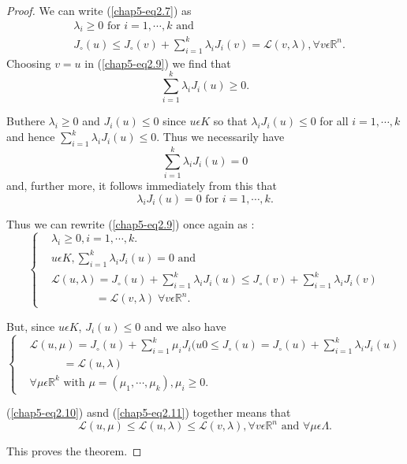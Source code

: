 \begin{proof}
We can write (\ref{chap5-eq2.7}) as
\begin{align*}
& \lambda_{i} \geq 0 \text{ for } i = 1, \cdots, k \text{ and }\\
& J_{\circ}(u) \leq J_{\circ}(v) + \sum_{i=1}^{k} \lambda_{i} J_{i} (v) = \mathscr{L}(v, \lambda), \forall v \epsilon \mathbb{R}^{n}.\tag{2.9}\label{chap5-eq2.9}
\end{align*}
Choosing $v = u$ in (\ref{chap5-eq2.9}) we find that
$$
\sum_{i=1}^{k} \lambda_{i} J_{i}(u) \geq 0.
$$

But\pageoriginale here $\lambda_{i} \geq 0$ and $J_{i} (u) \leq 0$ since $u \epsilon K$ so that $\lambda_{i} J_{i}(u) \leq 0$ for all $i = 1, \cdots, k$ and hence $\sum_{i=1}^{k} \lambda_{i} J_{i} (u) \leq 0$. Thus we necessarily have
$$
\sum_{i=1}^{k} \lambda_{i} J_{i}(u) = 0
$$
and, further more, it follows immediately from this that
$$
\lambda_{i} J_{i}(u) = 0 \text{ for } i = 1, \cdots, k.
$$

Thus we can rewrite (\ref{chap5-eq2.9}) once again as :
\begin{equation*}
\begin{cases}
& \lambda_{i} \geq 0, i = 1, \cdots, k.\\
& u \epsilon K, \sum_{i=1}^{k} \lambda_{i} J_{i} (u) = 0 \text{ and }\\
& \mathscr{L}(u, \lambda) = J_{\circ}(u) + \sum_{i=1}^{k} \lambda_{i}
  J_{i}(u) \leq J_{\circ}(v) + \sum_{i=1}^{k} \lambda_{i} J_{i} (v)\\
&\qquad\qquad = \mathscr{L} (v, \lambda) \; \forall v \epsilon \mathbb{R}^{n}.\tag{2.10}\label{chap5-eq2.10}
\end{cases}
\end{equation*}

But, since $u \epsilon K$, $J_{i}(u) \leq 0$ and we also have
\begin{equation*}
\begin{cases}
& \mathscr{L}(u, \mu) = J_{\circ}(u) + \sum_{i=1}^{k} \mu_{i} J_{i}
  (u0 \leq J_{\circ}(u) = J_{\circ}(u) + \sum_{i=1}^{k} \lambda_{i}
  J_{i} (u)\\
&\qquad\quad = \mathscr{L}(u, \lambda)\\
& \forall \mu \epsilon \mathbb{R}^{k} \text{ with } \mu
= (\mu_{1}, \cdots, \mu_{k}), \mu_{i} \geq 0.\tag{2.11}\label{chap5-eq2.11}
\end{cases}
\end{equation*}

(\ref{chap5-eq2.10}) asnd (\ref{chap5-eq2.11}) together means that
$$
\mathscr{L} (u, \mu) \leq \mathscr{L} (u, \lambda) \leq \mathscr{L}(v, \lambda), \forall v \epsilon \mathbb{R}^{n} \text{ and } \forall \mu \epsilon \Lambda.
$$

This proves the theorem.
\end{proof}

